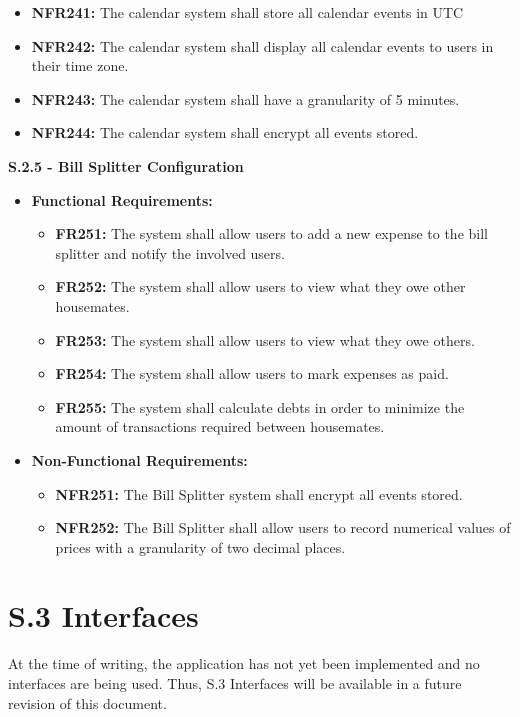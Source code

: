 \documentclass{scrreprt}
\newcommand*{\nsection}[1]{
    \section*{#1}
    \addcontentsline{toc}{section}{#1}
}
\theoremstyle{definition}
\begin{document}
\begin{flushleft}
\begin{itemize}
\begin{itemize}
  			\item \textbf{NFR241:} The calendar system shall store all calendar events in UTC
  			\item \textbf{NFR242:} The calendar system shall display all calendar events to users in their time zone. 
  			\item \textbf{NFR243:} The calendar system shall have a granularity of 5 minutes.
  			\item \textbf{NFR244:} The calendar system shall encrypt all events stored.
  		\end{itemize}
  	\end{itemize}
  	\item \textbf{S.2.5 - Bill Splitter Configuration}
  	\begin{itemize}
  		\item \textbf{Functional Requirements:}
  		\begin{itemize}
  			\item \textbf{FR251:} The system shall allow users to add a new expense to the bill splitter and notify the involved users.
            \item \textbf{FR252:} The system shall allow users to view what they owe other housemates.
            \item \textbf{FR253:} The system shall allow users to view what they owe others.
            \item \textbf{FR254:} The system shall allow users to mark expenses as paid.
            \item \textbf{FR255:} The system shall calculate debts in order to minimize the amount of transactions required between housemates.
  		\end{itemize}
  		\item \textbf{Non-Functional Requirements:}
  		\begin{itemize}
  			\item \textbf{NFR251:} The Bill Splitter system shall encrypt all events stored.
  			\item \textbf{NFR252:} The Bill Splitter shall allow users to record numerical values of prices with a granularity of two decimal places.

  		\end{itemize}
  	\end{itemize}
\end{flushleft}

\nsection{S.3 Interfaces}
At the time of writing, the application has not yet been implemented and no interfaces are being used.
Thus, S.3 Interfaces will be available in a future revision of this document.
\end{document}
